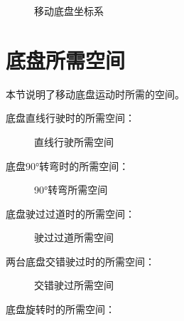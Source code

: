 \documentclass[a4paper,11pt,english,openany,oneside]{sphinxmanual}
\begin{document}
\begin{figure}[H]
\centering
\capstart

\noindent{}
\caption{移动底盘坐标系}\label{\detokenize{07 _u6280_u672f_u89c4_u683c:id64}}\end{figure}


\section{底盘所需空间}
\label{\detokenize{07 _u6280_u672f_u89c4_u683c:id42}}\label{\detokenize{07 _u6280_u672f_u89c4_u683c:id43}}
\sphinxAtStartPar
本节说明了移动底盘运动时所需的空间。

\sphinxAtStartPar
底盘直线行驶时的所需空间：

\begin{figure}[H]
\centering
\capstart

\noindent{}
\caption{直线行驶所需空间}\label{\detokenize{07 _u6280_u672f_u89c4_u683c:id65}}\end{figure}

\sphinxAtStartPar
底盘90°转弯时的所需空间：

\begin{figure}[H]
\centering
\capstart

\noindent{}
\caption{90°转弯所需空间}\label{\detokenize{07 _u6280_u672f_u89c4_u683c:id66}}\end{figure}

\sphinxAtStartPar
底盘驶过过道时的所需空间：

\begin{figure}[H]
\centering
\capstart

\noindent{}
\caption{驶过过道所需空间}\label{\detokenize{07 _u6280_u672f_u89c4_u683c:id67}}\end{figure}

\sphinxAtStartPar
两台底盘交错驶过时的所需空间：

\begin{figure}[H]
\centering
\capstart

\noindent{}
\caption{交错驶过所需空间}\label{\detokenize{07 _u6280_u672f_u89c4_u683c:id68}}\end{figure}

\sphinxAtStartPar
底盘旋转时的所需空间：
\end{document}
